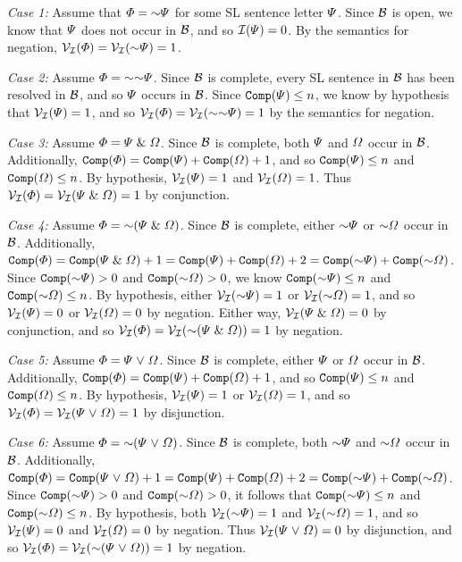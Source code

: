 \textit{Case 1:} 
Assume that $\metaA=\enot\metaB$ for some SL sentence letter $\varPsi$.
Since $\mathcal{B}$ is open, we know that $\varPsi$ does not occur in $\mathcal{B}$, and so $\mathcal{I}(\varPsi)=0$. 
By the semantics for negation, $\V{\I}(\metaA)=\V{\I}(\enot\metaB)=1$.

\textit{Case 2:} 
Assume $\metaA=\enot\enot\metaB$.
Since $\mathcal{B}$ is complete, every SL sentence in $\mathcal{B}$ has been resolved in $\mathcal{B}$, and so $\varPsi$ occurs in $\mathcal{B}$.
Since $\texttt{Comp}(\varPsi)\leq n$, we know by hypothesis that $\mathcal{V}_{\mathcal{I}}(\varPsi)=1$, and so $\V{\I}(\metaA)=\V{\I}(\enot\enot\metaB)=1$ by the semantics for negation. 

\textit{Case 3:} 
Assume $\varPhi=\varPsi\mathrel\&\varOmega$.
Since $\mathcal{B}$ is complete, both $\varPsi$ and $\varOmega$ occur in $\mathcal{B}$.
Additionally, $\texttt{Comp}(\varPhi) = \texttt{Comp}(\varPsi) + \texttt{Comp}(\varOmega) + 1$, and so $\texttt{Comp}(\varPsi)\leq n$ and $\texttt{Comp}(\varOmega)\leq n$.
By hypothesis, $\mathcal{V}_{\mathcal{I}}(\varPsi)=1$ and $\mathcal{V}_{\mathcal{I}}(\varOmega)=1$.  
Thus $\mathcal{V}_{\mathcal{I}}(\varPhi)=\mathcal{V}_{\mathcal{I}}(\varPsi\mathrel\&\varOmega)=1$ by conjunction.

\textit{Case 4:} 
Assume $\metaA=\enot(\metaB\eand\metaC)$.
Since $\mathcal{B}$ is complete, either $\enot\metaB$ or $\enot\metaC$ occur in $\mathcal{B}$.
Additionally, $\comp(\metaA) = \comp(\metaB\eand\metaC) + 1 = \comp(\metaB) + \comp(\metaC) + 2 = \comp(\enot\metaB) + \comp(\enot\metaC)$.
Since $\comp(\enot\metaB) > 0$ and $\comp(\enot\metaC) > 0$, we know $\comp(\enot\metaB)\leq n$ and $\comp(\enot\metaC)\leq n$.
By hypothesis, either $\V{\I}(\enot\metaB)=1$ or $\V{\I}(\enot\metaC)=1$, and so $\mathcal{V}_{\mathcal{I}}(\varPsi)=0$ or $\mathcal{V}_{\mathcal{I}}(\varOmega)=0$ by negation.
Either way, $\mathcal{V}_{\mathcal{I}}(\varPsi\mathrel\&\varOmega)=0$ by conjunction, and so $\V{\I}(\metaA)=\V{\I}(\enot(\metaB\eand\metaC))=1$ by negation.

\textit{Case 5:} 
Assume $\varPhi=\varPsi\mkern1mu\vee\mkern1mu\varOmega$.
Since $\mathcal{B}$ is complete, either $\varPsi$ or $\varOmega$ occur in $\mathcal{B}$.
Additionally, $\texttt{Comp}(\varPhi) = \texttt{Comp}(\varPsi) + \texttt{Comp}(\varOmega) + 1$, and so $\texttt{Comp}(\varPsi)\leq n$ and $\texttt{Comp}(\varOmega)\leq n$.
By hypothesis, $\mathcal{V}_{\mathcal{I}}(\varPsi)=1$ or $\mathcal{V}_{\mathcal{I}}(\varOmega)=1$, and so $\mathcal{V}_{\mathcal{I}}(\varPhi)=\mathcal{V}_{\mathcal{I}}(\varPsi\mkern1mu\vee\mkern1mu\varOmega)=1$ by disjunction.

\textit{Case 6:} 
Assume $\metaA=\enot(\metaB\eor\metaC)$.
Since $\mathcal{B}$ is complete, both $\enot\metaB$ and $\enot\metaC$ occur in $\mathcal{B}$.
Additionally, $\comp(\metaA) = \comp(\metaB\eor\metaC) + 1 = \comp(\metaB) + \comp(\metaC) + 2 = \comp(\enot\metaB) + \comp(\enot\metaC)$.
Since $\comp(\enot\metaB) > 0$ and $\comp(\enot\metaC) > 0$, it follows that $\comp(\enot\metaB)\leq n$ and $\comp(\enot\metaC)\leq n$.
By hypothesis, both $\V{\I}(\enot\metaB)=1$ and $\V{\I}(\enot\metaC)=1$, and so $\mathcal{V}_{\mathcal{I}}(\varPsi)=0$ and $\mathcal{V}_{\mathcal{I}}(\varOmega)=0$ by negation.
Thus $\mathcal{V}_{\mathcal{I}}(\varPsi\mkern1mu\vee\mkern1mu\varOmega)=0$ by disjunction, and so $\V{\I}(\metaA)=\V{\I}(\enot(\metaB\eor\metaC))=1$ by negation.

